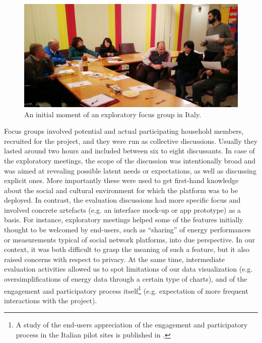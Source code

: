 %
%


%
\begin{figure}[t]
	\sidecaption[t]
	\includegraphics[width=.45\linewidth]{img/FocusGroup_TN.jpg}
	\caption{An initial moment of an exploratory focus group in Italy.}
	\label{fig:focusgroups}
\end{figure}


Focus groups involved potential and actual participating household members, recruited for the project, and they
were run as collective discussions. Usually they lasted around two hours and included between six to eight discussants.
In case of the exploratory meetings, the scope of the discussion was intentionally broad and was aimed at revealing possible latent
needs or expectations, as well as discussing explicit ones. More importantly these were used to get first-hand knowledge
about the social and cultural environment for which the platform was to be deployed. In contrast, the evaluation discussions
had more specific focus and involved concrete artefacts (e.g. an interface mock-up or app prototype)
as a basis.
% 
For instance, exploratory meetings helped some of the features initially thought
to be welcomed by end-users, such as ``sharing'' of energy performances or measurements typical of social network platforms, into due perspective.
In our context, it was both difficult to grasp the meaning of such a feature, but it also raised
 concerns with respect to privacy. At the same time, intermediate evaluation activities allowed us to spot
limitations of our data visualization (e.g. oversimplifications of energy data through a certain type of charts),
and of the engagement and participatory process itself\footnote{A study of the end-users appreciation of the engagement and participatory process in the Italian pilot sites
is published in \cite{capaccioli_exploring_2017}.}
(e.g. expectation of more frequent interactions with the project).

